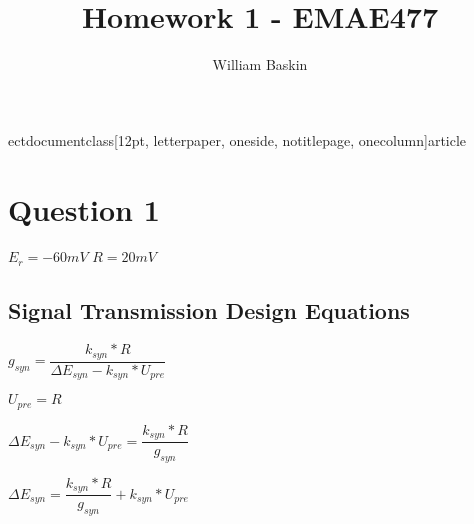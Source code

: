 ectdocumentclass[12pt, letterpaper, oneside, notitlepage, onecolumn]{article}
\author{William Baskin}
\title{Homework 1 - EMAE477}
\pagestyle{plain}

\usepackage{parskip}

\usepackage{textcomp}
\usepackage[utf8]{inputenc}
\usepackage[english]{babel}
\usepackage{listings}
\usepackage{color}
\usepackage{verbatim}
\usepackage{soul}
\usepackage[margin=0.69in]{geometry}

\usepackage{amsmath, amssymb}

\usepackage{graphicx}
\graphicspath{ {Baskin_HW1/} }



\DeclareMathOperator*{\argmax}{arg\,max}

\DeclareMathOperator*{\argmin}{arg\,min}


\maketitle

\section{Question 1}


$E_{r} = -60mV$
$R = 20mV$

\subsection{Signal Transmission Design Equations}

$g_{syn} = \dfrac{k_{syn} * R}{\Delta E_{syn} - k_{syn} * U_{pre}}$

$U_{pre} = R$

$\Delta E_{syn} - k_{syn} * U_{pre} = \dfrac{k_{syn} * R}{g_{syn}}$

$\Delta E_{syn} = \dfrac{k_{syn} * R}{g_{syn}} + k_{syn} * U_{pre}$

